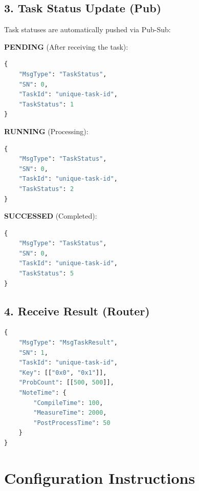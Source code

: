 \documentclass[UTF8, a4paper, 12pt]{article}
\begin{document}
\subsection{3. Task Status Update (Pub)}
Task statuses are automatically pushed via Pub-Sub:

\textbf{PENDING} (After receiving the task):
\begin{lstlisting}[language=Python]
{
    "MsgType": "TaskStatus",
    "SN": 0,
    "TaskId": "unique-task-id",
    "TaskStatus": 1
}
\end{lstlisting}

\textbf{RUNNING} (Processing):
\begin{lstlisting}[language=Python]
{
    "MsgType": "TaskStatus",
    "SN": 0,
    "TaskId": "unique-task-id",
    "TaskStatus": 2
}
\end{lstlisting}

\textbf{SUCCESSED} (Completed):
\begin{lstlisting}[language=Python]
{
    "MsgType": "TaskStatus",
    "SN": 0,
    "TaskId": "unique-task-id",
    "TaskStatus": 5
}
\end{lstlisting}

\subsection{4. Receive Result (Router)}
\begin{lstlisting}[language=Python]
{
    "MsgType": "MsgTaskResult",
    "SN": 1,
    "TaskId": "unique-task-id",
    "Key": [["0x0", "0x1"]],
    "ProbCount": [[500, 500]],
    "NoteTime": {
        "CompileTime": 100,
        "MeasureTime": 2000,
        "PostProcessTime": 50
    }
}
\end{lstlisting}

\section{Configuration Instructions}
\end{document}

